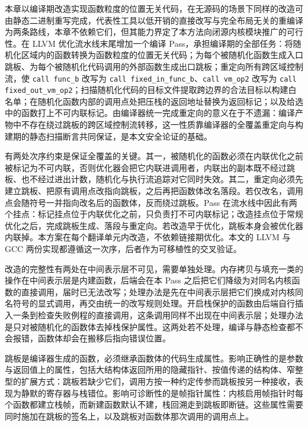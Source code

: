 本章以编译期改造实现函数粒度的位置无关代码，在无源码的场景下同样的改造可由静态二进制重写完成，代表性工具以低开销的直接改写\citep{hawkins2017zipr}与完全布局无关的重编译\citep{williamsking2020egalito}为两条路线，本章不依赖它们，但其能力界定了本方法向闭源内核模块推广的可行性。在 LLVM 优化流水线末尾增加一个编译 Pass\citep{llvm2024newpm}，承担编译期的全部任务：将随机化区域内的函数转换为函数粒度的位置无关代码；为每个被随机化函数生成入口跳板、为每个被随机化代码调用的外部函数生成出口跳板；重定向所有跨区域控制流，使 \lstinline[breaklines=false]@call func_b@ 改写为 \lstinline[breaklines=false]@call fixed_in_func_b@、\lstinline[breaklines=false]@call vm_op2@ 改写为 \lstinline[breaklines=false]@call fixed_out_vm_op2@；扫描随机化代码的目标文件提取跨边界的合法目标以构建白名单；在随机化函数内部的调用点处把压栈的返回地址替换为返回标记；以及给选中的函数打上不可内联标记。由编译器统一完成重定向的意义在于不遗漏：编译产物中不存在绕过跳板的跨区域控制流转移，这一性质靠编译器的全覆盖重定向与构建期的静态扫描断言共同保证，是本文安全论证的基础。

有两处次序约束是保证全覆盖的关键。其一，被随机化的函数必须在内联优化之前被标记为不可内联，否则优化器会把它内联进调用者，内联出的副本既不经过跳板、也不经过进出计数，随机化与执行流追踪对它同时失效。其二，重定向必须先建立跳板、把原有调用点改指向跳板，之后再把函数体改名落段。若仅改名，调用点会随符号一并指向改名后的函数体，反而绕过跳板。Pass 在流水线中因此有两个挂点：标记挂点位于内联优化之前，只负责打不可内联标记；改造挂点位于常规优化之后，完成跳板生成、落段与重定向。若改造早于优化，跳板本身会被优化器内联掉。本方案在每个翻译单元内改造，不依赖链接期优化。本文的 LLVM 与 GCC 两份实现都遵循这一次序，后者作为可移植性的交叉验证。

改造的完整性有两处在中间表示层不可见，需要单独处理。内存拷贝与填充一类的操作在中间表示层是内建函数，后端会在本 Pass 之后把它们降级为对同名内核函数的直接调用，届时已无法改写；处理办法是先在中间表示层把它们换成对内核同名符号的显式调用，再交由统一的改写规则处理。开启栈保护的函数由后端自行插入一条到检查失败例程的直接调用，这条调用同样不出现在中间表示层；处理办法是只对被随机化的函数体去掉栈保护属性。这两处若不处理，编译与静态检查都不会报错，函数体却会在搬移后指向错误位置。

跳板是编译器生成的函数，必须继承函数体的代码生成属性。影响正确性的是参数与返回值上的属性，包括大结构体返回所用的隐藏指针、按值传递的结构体、窄整型的扩展方式：跳板若缺少它们，调用方按一种约定传参而跳板按另一种接收，表现为静默的寄存器与栈错位。影响可诊断性的是帧指针属性：内核启用帧指针时每个函数都建立栈帧，而新建函数默认不建，栈回溯走到跳板即断链。这些属性需要同时施加在跳板的签名上，以及跳板对函数体那次调用的调用点上。

